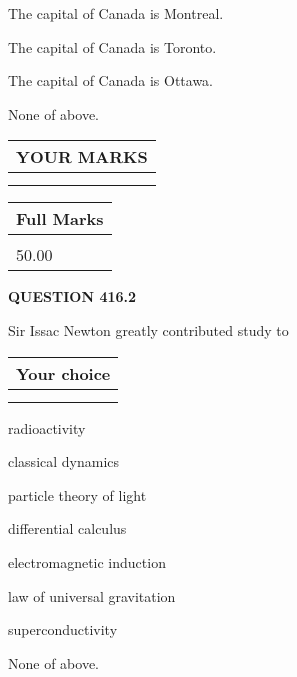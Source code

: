 \documentclass[12pt]{article}
\begin{document}
  
 
 
The capital of Canada is Montreal.
 
 
The capital of Canada is Toronto.
 
 
The capital of Canada is Ottawa.
 
 
 None of above.
 
 
  
\vspace{0.2in}
  
\noindent\begin{tabular}{|l|}
\hline
 YOUR MARKS  \\
\hline
 \\ 
 \\ 
\hline
\end{tabular}
\hspace{0.05in} \begin{tabular}{|l|}
\hline
 Full Marks  \\
\hline
 \\ 
50.00 \\
\hline
\end{tabular}
{\textbf{\Large{QUESTION
416.2 
}}}
  
  
Sir Issac Newton greatly contributed study to
  
  
\noindent\hspace{3.0in} \begin{tabular}{|l|}
\hline
Your choice \\
\hline
 \\ 
 \\ 
\hline
\end{tabular}
  
  
 
 
radioactivity
 
 
classical dynamics
 
 
particle theory of light
 
 
differential calculus
 
 
electromagnetic induction
 
 
law of universal gravitation
 
 
superconductivity
 
 
 None of above.
 
\end{document}
